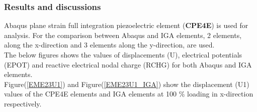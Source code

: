 \documentclass[11pt]{article}
\begin{document}
\subsubsection{Results and discussions}
Abaqus plane strain full integration piezoelectric element (\textbf{CPE4E}) is used for analysis. For the comparison between Abaqus and IGA elements, 2 elements, along the x-direction and 3 elements along the y-direction, are used.\\
The below figures shows the values of displacements (U), electrical potentials (EPOT) and reactive electrical nodal charge (RCHG) for both Abaqus and IGA elements.\\
Figure(\ref{EME23U1}) and Figure(\ref{EME23U1_IGA}) show the displacement (U1) values of the CPE4E elements and IGA elements at 100 \% loading in x-direction respectively. \\
\end{document}
